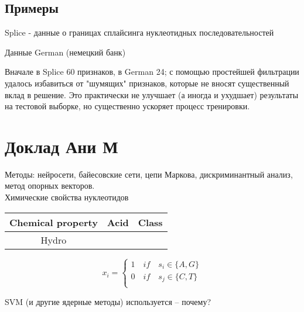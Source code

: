 \documentclass[main.tex]{subfiles}
\begin{document}
\subsection{Примеры}

Splice - данные о границах сплайсинга нуклеотидных последовательностей

Данные  German (немецкий банк)

\begin{leftbar}
	Вначале в Splice 60 признаков, в German 24; с помощью простейшей фильтрации удалось избавиться от "шумящих" признаков, которые не вносят существенный вклад в решение.
	Это практически не улучшает (а иногда и ухудшает) результаты на тестовой выборке, но существенно ускоряет процесс тренировки.
\end{leftbar}

\section{Доклад Ани М}


Методы: нейросети, байесовские сети, цепи Маркова, дискриминантный анализ, метод опорных векторов. \\

Химические свойства нуклеотидов

\begin{tabular}{c|c c}
Chemical property & Acid & Class \\
\hline
Hydro %
\end{tabular}

\[ x_i = \begin{cases}
	1 \quad if \quad s_i \in \{ A, G \} \\
	0 \quad if \quad s_j \in \{ C, T \} \\
\end{cases} \]

SVM (и другие ядерные методы) используется -- почему?

\end{document}
